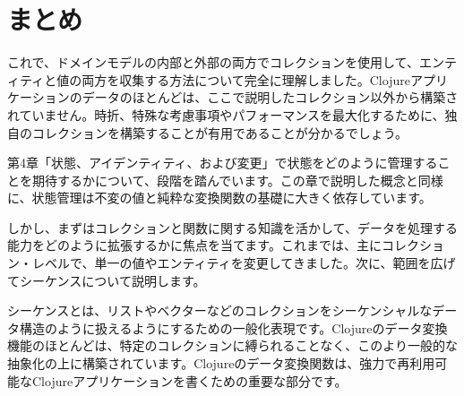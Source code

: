 \section{まとめ}

これで、ドメインモデルの内部と外部の両方でコレクションを使用して、エンティティと値の両方を収集する方法について完全に理解しました。Clojureアプリケーションのデータのほとんどは、ここで説明したコレクション以外から構築されていません。時折、特殊な考慮事項やパフォーマンスを最大化するために、独自のコレクションを構築することが有用であることが分かるでしょう。

第4章「状態、アイデンティティ、および変更」で状態をどのように管理することを期待するかについて、段階を踏んでいます。この章で説明した概念と同様に、状態管理は不変の値と純粋な変換関数の基礎に大きく依存しています。

しかし、まずはコレクションと関数に関する知識を活かして、データを処理する能力をどのように拡張するかに焦点を当てます。これまでは、主にコレクション・レベルで、単一の値やエンティティを変更してきました。次に、範囲を広げてシーケンスについて説明します。

シーケンスとは、リストやベクターなどのコレクションをシーケンシャルなデータ構造のように扱えるようにするための一般化表現です。Clojureのデータ変換機能のほとんどは、特定のコレクションに縛られることなく、このより一般的な抽象化の上に構築されています。Clojureのデータ変換関数は、強力で再利用可能なClojureアプリケーションを書くための重要な部分です。
